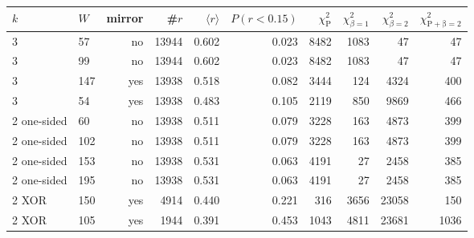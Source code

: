 \begin{tabular}{llrrrrrrrr}
\toprule
$k$ & $W$ & mirror & \#$r$ & $\langle r\rangle$ & $P(r<0.15)$ & $\chi^2_\mathrm{P}$ & $\chi^2_{\beta=1}$ & $\chi^2_{\beta=2}$ & $\chi^2_\mathrm{P+\beta=2}$ \\
\midrule
3 & 57 & no & 13944 & 0.602 & 0.023 & 8482 & 1083 & 47 & 47 \\
3 & 99 & no & 13944 & 0.602 & 0.023 & 8482 & 1083 & 47 & 47 \\
3 & 147 & yes & 13938 & 0.518 & 0.082 & 3444 & 124 & 4324 & 400 \\
3 & 54 & yes & 13938 & 0.483 & 0.105 & 2119 & 850 & 9869 & 466 \\
2 one-sided & 60 & no & 13938 & 0.511 & 0.079 & 3228 & 163 & 4873 & 399 \\
2 one-sided & 102 & no & 13938 & 0.511 & 0.079 & 3228 & 163 & 4873 & 399 \\
2 one-sided & 153 & no & 13938 & 0.531 & 0.063 & 4191 & 27 & 2458 & 385 \\
2 one-sided & 195 & no & 13938 & 0.531 & 0.063 & 4191 & 27 & 2458 & 385 \\
2 XOR & 150 & yes & 4914 & 0.440 & 0.221 & 316 & 3656 & 23058 & 150 \\
2 XOR & 105 & yes & 1944 & 0.391 & 0.453 & 1043 & 4811 & 23681 & 1036 \\
\bottomrule
\end{tabular}
